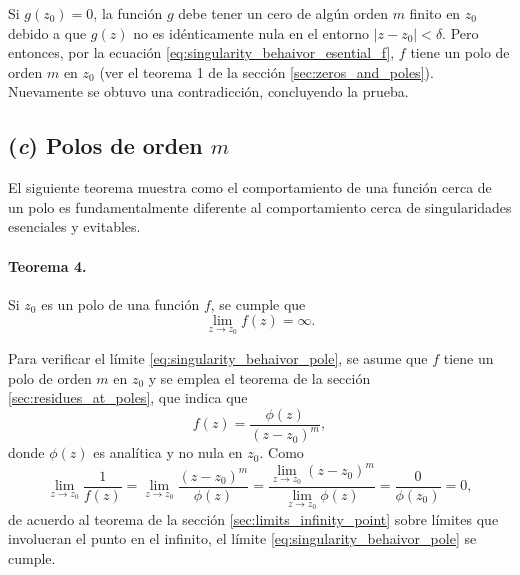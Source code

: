 \documentclass[a4paper]{report}
\begin{document}
Si \(g(z_0)=0\), la función \(g\) debe tener un cero de algún orden \(m\) finito en \(z_0\) debido a que \(g(z)\) no es idénticamente nula en el entorno \(|z-z_0|<\delta\). Pero entonces, por la ecuación \ref{eq:singularity_behaivor_esential_f}, \(f\) tiene un polo de orden \(m\) en \(z_0\) (ver el teorema 1 de la sección \ref{sec:zeros_and_poles}). Nuevamente se obtuvo una contradicción, concluyendo la prueba.
  
\subsection*{(\textit{c}) Polos de orden \(m\)}

El siguiente teorema muestra como el comportamiento de una función cerca de un polo es fundamentalmente diferente al comportamiento cerca de singularidades esenciales y evitables.

\paragraph{Teorema 4.} Si \(z_0\) es un polo de una función \(f\), se cumple que 
\begin{equation}\label{eq:singularity_behaivor_pole}
 \lim_{z\to z_0}f(z)=\infty. 
\end{equation}

Para verificar el límite \ref{eq:singularity_behaivor_pole}, se asume que \(f\) tiene un polo de orden \(m\) en \(z_0\) y se emplea el teorema de la sección \ref{sec:residues_at_poles}, que indica que 
\[
 f(z)=\frac{\phi(z)}{(z-z_0)^m},
\]
donde \(\phi(z)\) es analítica y no nula en \(z_0\). Como
\[
 \lim_{z\to z_0}\frac{1}{f(z)}=\lim_{z\to z_0}\frac{(z-z_0)^m}{\phi(z)}=\frac{\lim\limits_{z\to z_0}(z-z_0)^m}{\lim\limits_{z\to z_0}\phi(z)}=\frac{0}{\phi(z_0)}=0,
\]
de acuerdo al teorema de la sección \ref{sec:limits_infinity_point} sobre límites que involucran el punto en el infinito, el límite \ref{eq:singularity_behaivor_pole} se cumple.

























































\end{document}
